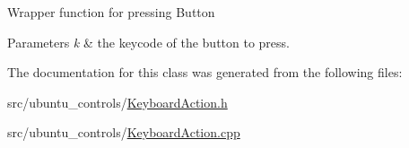 Wrapper function for pressing Button


\begin{DoxyParams}{Parameters}
{\em k} & the keycode of the button to press. \\
\hline
\end{DoxyParams}


The documentation for this class was generated from the following files\+:\begin{DoxyCompactItemize}
\item 
src/ubuntu\+\_\+controls/\hyperlink{KeyboardAction_8h}{Keyboard\+Action.\+h}\item 
src/ubuntu\+\_\+controls/\hyperlink{KeyboardAction_8cpp}{Keyboard\+Action.\+cpp}\end{DoxyCompactItemize}
